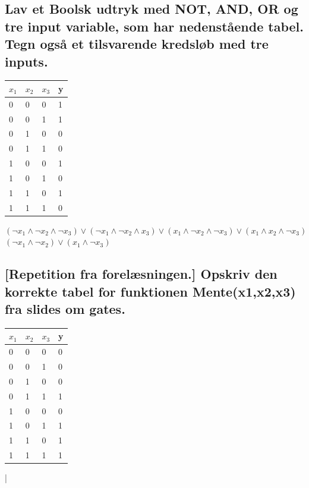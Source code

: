 \documentclass[12pt, a4paper]{article}
\begin{document}
					\subsection{Lav et Boolsk udtryk med NOT, AND, OR og tre input variable, som har nedenstående tabel. Tegn også et tilsvarende kredsløb med tre inputs.}
						\begin{table}[h!]
						\begin{tabular}{|l|l|l|l|}
						\hline	
						$x_1$  & $x_2$  & $x_3$  & y \\ \hline
						0    & 0    & 0    & 1 \\ \hline
						0    & 0    & 1    & 1 \\ \hline
						0    & 1    & 0    & 0 \\ \hline
						0    & 1    & 1    & 0 \\ \hline
						1    & 0    & 0    & 1 \\ \hline
						1    & 0    & 1    & 0 \\ \hline
						1    & 1    & 0    & 1 \\ \hline
						1    & 1    & 1    & 0 \\ \hline
						\end{tabular}
						\end{table}
						$ (\neg x_1 \land \neg x_2 \land \neg x_3) \lor (\neg x_1 \land \neg x_2 \land x_3) \lor (x_1 \land \neg x_2 \land \neg x_3) \lor (x_1 \land x_2 \land \neg x_3)$\\
						$(\neg x_1 \land \neg x_2)\lor (x_1\land \neg x_3)$
				\subsection{[Repetition fra forelæsningen.] Opskriv den korrekte tabel for funktionen Mente(x1,x2,x3) fra slides om gates.}
					\begin{table}[h!]
						\begin{tabular}{|l|l|l|l|}
						\hline	
						$x_1$  & $x_2$  & $x_3$  & y \\ \hline
						0    & 0    & 0    & 0 \\ \hline
						0    & 0    & 1    & 0 \\ \hline
						0    & 1    & 0    & 0 \\ \hline
						0    & 1    & 1    & 1 \\ \hline
						1    & 0    & 0    & 0 \\ \hline
						1    & 0    & 1    & 1 \\ \hline
						1    & 1    & 0    & 1 \\ \hline
						1    & 1    & 1    & 1 \\ \hline
						\end{tabular}
					\end{table}|
\end{document}
